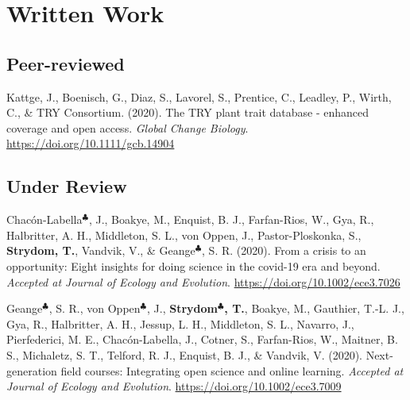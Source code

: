 \documentclass[11pt, a4paper]{awesome-cv}
\begin{document}
\newpage

\hypertarget{written-work}{%
\section{Written Work}\label{written-work}}

\hypertarget{peer-reviewed}{%
\subsection{\texorpdfstring{\textbf{Peer-reviewed}}{Peer-reviewed}}\label{peer-reviewed}}

\begingroup
\setlength{\parindent}{-0.5in}
\setlength{\leftskip}{0.5in}

\hypertarget{refs_journals}{}
\leavevmode\hypertarget{ref-Kattge_2020}{}%
Kattge, J., Boenisch, G., Diaz, S., Lavorel, S., Prentice, C., Leadley, P., Wirth, C., \& TRY Consortium. (2020). The TRY plant trait database - enhanced coverage and open access. \emph{Global Change Biology}. \url{https://doi.org/10.1111/gcb.14904}

\endgroup

\hypertarget{under-review}{%
\subsection{\texorpdfstring{\textbf{Under Review}}{Under Review}}\label{under-review}}

\begingroup
\setlength{\parindent}{-0.5in}
\setlength{\leftskip}{0.5in}

\hypertarget{refs_review}{}
\leavevmode\hypertarget{ref-Chac_2020}{}%
Chacón-Labella\(^\clubsuit\), J., Boakye, M., Enquist, B. J., Farfan-Rios, W., Gya, R., Halbritter, A. H., Middleton, S. L., von Oppen, J., Pastor-Ploskonka, S., \textbf{Strydom, T.}, Vandvik, V., \& Geange\(^\clubsuit\), S. R. (2020). From a crisis to an opportunity: Eight insights for doing science in the covid-19 era and beyond. \emph{Accepted at Journal of Ecology and Evolution}. \url{https://doi.org/10.1002/ece3.7026}

\leavevmode\hypertarget{ref-Geange_2020}{}%
Geange\(^\clubsuit\), S. R., von Oppen\(^\clubsuit\), J., \textbf{Strydom\(^\clubsuit\), T.}, Boakye, M., Gauthier, T.-L. J., Gya, R., Halbritter, A. H., Jessup, L. H., Middleton, S. L., Navarro, J., Pierfederici, M. E., Chacón-Labella, J., Cotner, S., Farfan-Rios, W., Maitner, B. S., Michaletz, S. T., Telford, R. J., Enquist, B. J., \& Vandvik, V. (2020). Next-generation field courses: Integrating open science and online learning. \emph{Accepted at Journal of Ecology and Evolution}. \url{https://doi.org/10.1002/ece3.7009}
\end{document}
